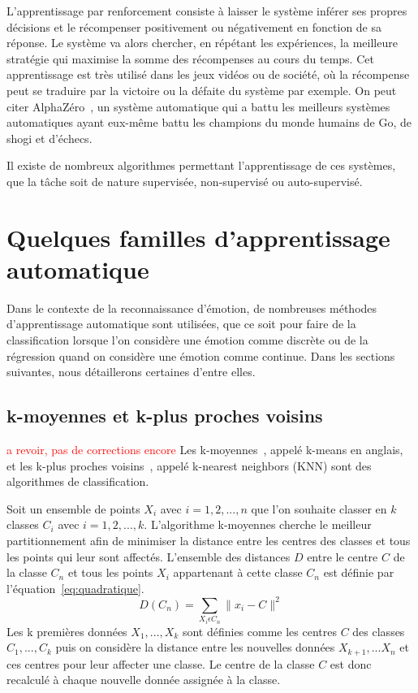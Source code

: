 L'apprentissage par renforcement consiste à laisser le système inférer ses propres décisions et le récompenser positivement ou négativement en fonction de sa réponse. Le système va alors chercher, en répétant les expériences, la meilleure stratégie qui maximise la somme des récompenses au cours du temps. Cet apprentissage est très utilisé dans les jeux vidéos ou de société, où la récompense peut se traduire par la victoire ou la défaite du système par exemple. On peut citer AlphaZéro~\cite{Silver2018}, un système automatique qui a battu les meilleurs systèmes automatiques ayant eux-même battu les champions du monde humains de Go, de shogi et d'échecs.

Il existe de nombreux algorithmes permettant l'apprentissage de ces systèmes, que la tâche soit de nature supervisée, non-supervisé ou auto-supervisé.

\section{Quelques familles d'apprentissage automatique}
Dans le contexte de la reconnaissance d'émotion, de nombreuses méthodes d'apprentissage automatique sont utilisées, que ce soit pour faire de la classification lorsque l'on considère une émotion comme discrète ou de la régression quand on considère une émotion comme continue.
Dans les sections suivantes, nous détaillerons certaines d'entre elles.

\subsection{k-moyennes et k-plus proches voisins}
\textcolor{red}{a revoir, pas de corrections encore}
Les k-moyennes~\cite{Lloyd1982}, appelé k-means en anglais, et les k-plus proches voisins~\cite{Fix1951,Cover1967}, appelé k-nearest neighbors (KNN) sont des algorithmes de classification.

Soit un ensemble de points $X_i$ avec $i=1,2,...,n$ que l'on souhaite classer en $k$ classes $C_i$ avec $i=1,2,...,k$. L’algorithme k-moyennes cherche le meilleur partitionnement afin de minimiser la distance entre les centres des classes et tous les points qui leur sont affectés.
L'ensemble des distances $D$ entre le centre $C$ de la classe $C_n$ et tous les points $X_i$ appartenant à cette classe $C_n$ est définie par l'équation~\ref{eq:quadratique}.
\begin{equation}
  D(C_n) = \sum_{X_i\epsilon C_n}   \| x_i - C \|^2
  \label{eq:quadratique}
\end{equation}
Les k premières données $X_1,...,X_k$ sont définies comme les centres $C$ des classes $C_1,...,C_k$ puis on considère la distance entre les nouvelles données $X_{k+1},...X_n$ et ces centres pour leur affecter une classe. Le centre de la classe $C$ est donc recalculé à chaque nouvelle donnée assignée à la classe.

